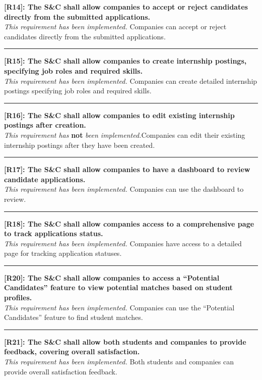\noindent\textbf{[R14]: The S\&C shall allow companies to accept or reject candidates directly from the submitted applications.} \\
\textit{This requirement has been implemented.} Companies can accept or reject candidates directly from the submitted applications.

\noindent\rule{16cm}{0.4pt}

\noindent\textbf{[R15]: The S\&C shall allow companies to create internship postings, specifying job roles and required skills.} \\
\textit{This requirement has been implemented.} Companies can create detailed internship postings specifying job roles and required skills.

\noindent\rule{16cm}{0.4pt}

\noindent\textbf{[R16]: The S\&C shall allow companies to edit existing internship postings after creation.} \\
\textit{This requirement has} \textbf{not} \textit{been implemented.}Companies can edit their existing internship postings after they have been created.

\noindent\rule{16cm}{0.4pt}

\noindent\textbf{[R17]: The S\&C shall allow companies to have a dashboard to review candidate applications.} \\
\textit{This requirement has been implemented.} Companies can use the dashboard to review.

\noindent\rule{16cm}{0.4pt}

\noindent\textbf{[R18]: The S\&C shall allow companies access to a comprehensive page to track applications status.} \\
\textit{This requirement has been implemented.} Companies have access to a detailed page for tracking application statuses.

\noindent\rule{16cm}{0.4pt}

\noindent\textbf{[R20]: The S\&C shall allow companies to access a ``Potential Candidates'' feature to view potential matches based on student profiles.} \\
\textit{This requirement has been implemented.} Companies can use the ``Potential Candidates'' feature to find student matches.

\noindent\rule{16cm}{0.4pt}

\noindent\textbf{[R21]: The S\&C shall allow both students and companies to provide feedback, covering overall satisfaction.} \\
\textit{This requirement has been implemented.} Both students and companies can provide overall satisfaction feedback.

